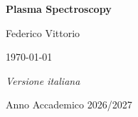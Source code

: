 \documentclass[a4paper, 10 pt]{book}
\begin{document}
\begin{titlepage}
    \centering
    \vspace*{3cm}
    {\Huge\bfseries Plasma Spectroscopy\par}
    
    \vspace{1.5cm}
    {\Large Federico Vittorio\par}
    
    \vspace{0.6cm}
    {\large \today\par}
    
    \vfill
    
   {\normalsize\itshape Versione italiana\par}
    \vspace{0.3cm}
    {\large Anno Accademico 2026/2027\par}
    \vspace*{1cm}
\end{titlepage}
\tableofcontents










\end{document}
